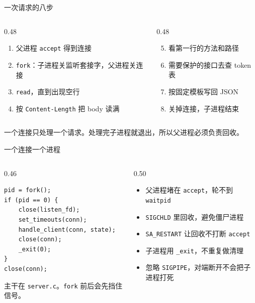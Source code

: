 \documentclass[aspectratio=169,11pt,professionalfonts]{ctexbeamer}
\begin{document}
\begin{frame}{一次请求的八步}
\begin{columns}[T,onlytextwidth]
\begin{column}{0.48\textwidth}
\begin{enumerate}
  \item 父进程 \texttt{accept} 得到连接
  \item \texttt{fork}：子进程关监听套接字，父进程关连接
  \item \texttt{read}，直到出现空行
  \item 按 \texttt{Content-Length} 把 body 读满
\end{enumerate}
\end{column}
\begin{column}{0.48\textwidth}
\begin{enumerate}
  \setcounter{enumi}{4}
  \item 看第一行的方法和路径
  \item 需要保护的接口去查 token 表
  \item 按固定模板写回 JSON
  \item 关掉连接，子进程结束
\end{enumerate}
\end{column}
\end{columns}
\vspace{0.6em}
一个连接只处理一个请求。处理完子进程就退出，所以父进程必须负责回收。
\end{frame}

\begin{frame}[fragile]{一个连接一个进程}
\begin{columns}[T,onlytextwidth]
\begin{column}{0.46\textwidth}
\begin{lstlisting}[style=snippet]
pid = fork();
if (pid == 0) {
    close(listen_fd);
    set_timeouts(conn);
    handle_client(conn, state);
    close(conn);
    _exit(0);
}
close(conn);
\end{lstlisting}
{\scriptsize 主干在 \texttt{server.c}。\texttt{fork} 前后会先挡住信号。}
\end{column}
\begin{column}{0.50\textwidth}
{\footnotesize
\begin{itemize}
  \item 父进程堵在 \texttt{accept}，轮不到 \texttt{waitpid}
  \item \texttt{SIGCHLD} 里回收，避免僵尸进程
  \item \texttt{SA\_RESTART} 让回收不打断 \texttt{accept}
  \item 子进程用 \texttt{\_exit}，不重复做清理
  \item 忽略 \texttt{SIGPIPE}，对端断开不会把子进程打死
\end{itemize}
}
\end{column}
\end{columns}
\end{frame}
\end{document}
